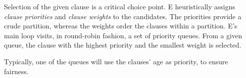 
  Selection of the given clause is a critical choice point.
  E heuristically assigns \emph{clause priorities} and \emph{clause weights} to
  the candidates.
  The priorities provide a crude partition, whereas the weights order the clauses
  within a partition.
  E's main loop visits, in round-robin fashion, a set of priority queues. From a given
  queue, the clause with the highest priority and the smallest weight is selected.
  \begin{rep}%
  Typically, one of the queues will use the clauses' age as priority, to ensure
  fairness.
  \end{rep}
  
